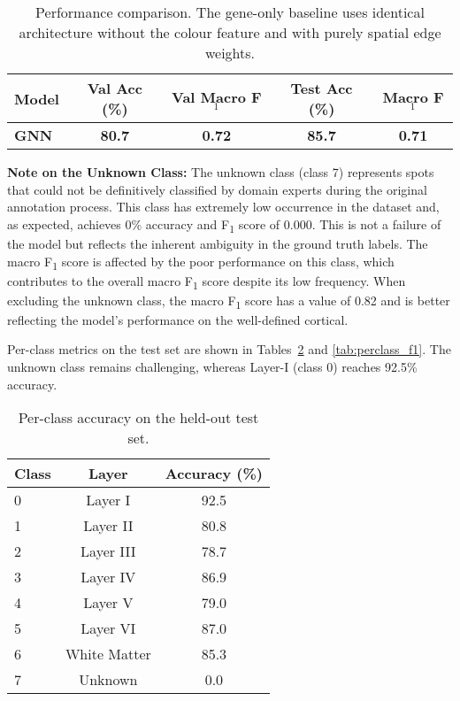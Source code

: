 \documentclass[conference]{IEEEtran}
\begin{document}
\begin{table}[H]
  \centering
  \caption{Performance comparison. The gene-only baseline uses identical 
  architecture without the colour feature and with purely spatial edge weights.}
  \label{tab:results}
  \begin{tabular}{lcccc}
    \toprule
    Model & Val Acc (\%) & Val Macro F$_1$ & Test Acc (\%) & Macro F$_1$ \\ 
    \midrule
    \textbf{GNN} & \textbf{80.7} & \textbf{0.72} & \textbf{85.7} & 
    \textbf{0.71} \\ \bottomrule
  \end{tabular}
\end{table}

\textbf{Note on the Unknown Class:} The unknown class (class 7) represents 
spots that could not be definitively classified by domain experts during the 
original annotation process. This class has extremely low occurrence in the 
dataset and, as expected, achieves 0\% accuracy and F\textsubscript{1} score 
of 0.000. This is not a failure of the model but reflects the inherent 
ambiguity in the ground truth labels. The macro F\textsubscript{1} score is 
affected by the poor performance on this class, which contributes to the 
overall macro F\textsubscript{1} score despite its low frequency. When 
excluding the unknown class, the macro F\textsubscript{1} score has a value of 0.82
and is better reflecting the model's performance on the well-defined cortical.

Per-class metrics on the test set are shown in Tables~\ref{tab:perclass_acc} and 
\ref{tab:perclass_f1}. The unknown class remains challenging, 
whereas Layer-I (class 0) reaches 92.5\% accuracy.

\begin{table}[H]
  \centering
  \caption{Per-class accuracy on the held-out test set.}
  \label{tab:perclass_acc}
  \begin{tabular}{lcc}
    \toprule
    Class & Layer & Accuracy (\%) \\ \midrule
    0 & Layer I & 92.5 \\
    1 & Layer II & 80.8 \\
    2 & Layer III & 78.7 \\
    3 & Layer IV & 86.9 \\
    4 & Layer V & 79.0 \\
    5 & Layer VI & 87.0 \\
    6 & White Matter & 85.3 \\
    7 & Unknown & 0.0 \\ \bottomrule
  \end{tabular}
\end{table}
\end{document}
